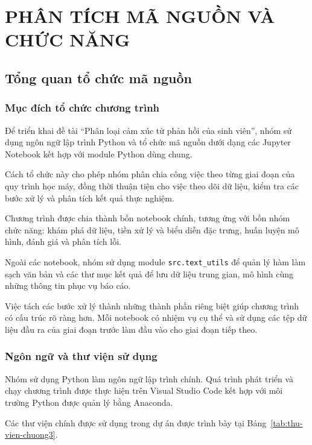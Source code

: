 
\chapter{PHÂN TÍCH MÃ NGUỒN VÀ CHỨC NĂNG}


\section{Tổng quan tổ chức mã nguồn}

\subsection{Mục đích tổ chức chương trình}

Để triển khai đề tài ``Phân loại cảm xúc từ phản hồi của sinh viên'', nhóm sử dụng ngôn ngữ lập trình Python và tổ chức mã nguồn dưới dạng các Jupyter Notebook kết hợp với module Python dùng chung.

Cách tổ chức này cho phép nhóm phân chia công việc theo từng giai đoạn của quy trình học máy, đồng thời thuận tiện cho việc theo dõi dữ liệu, kiểm tra các bước xử lý và phân tích kết quả thực nghiệm.

Chương trình được chia thành bốn notebook chính, tương ứng với bốn nhóm chức năng: khám phá dữ liệu, tiền xử lý và biểu diễn đặc trưng, huấn luyện mô hình, đánh giá và phân tích lỗi.

Ngoài các notebook, nhóm sử dụng module \texttt{src.text\_utils} để quản lý hàm làm sạch văn bản và các thư mục kết quả để lưu dữ liệu trung gian, mô hình cùng những thông tin phục vụ báo cáo.

Việc tách các bước xử lý thành những thành phần riêng biệt giúp chương trình có cấu trúc rõ ràng hơn. Mỗi notebook có nhiệm vụ cụ thể và sử dụng các tệp dữ liệu đầu ra của giai đoạn trước làm đầu vào cho giai đoạn tiếp theo.


\subsection{Ngôn ngữ và thư viện sử dụng}

Nhóm sử dụng Python làm ngôn ngữ lập trình chính. Quá trình phát triển và chạy chương trình được thực hiện trên Visual Studio Code kết hợp với môi trường Python được quản lý bằng Anaconda.

Các thư viện chính được sử dụng trong dự án được trình bày tại Bảng~\ref{tab:thu-vien-chuong3}.

